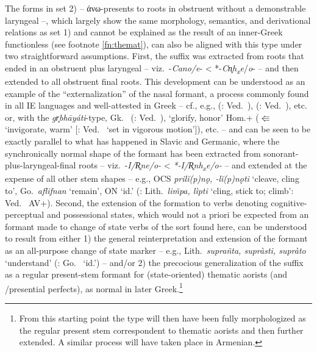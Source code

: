 \documentclass[output=paper,colorlinks,citecolor=brown]{langscibook}
\begin{document}
The forms in set 2) -- άνω-presents  to roots in obstruent without a demonstrable laryngeal --, which largely show the same morphology, semantics, and derivational relations as set 1) and cannot be explained as the result of an inner-Greek functionless  (see footnote \ref{fn:themat}), can also be aligned with this type under two straightforward assumptions. First, the suffix   was extracted from roots that ended in an obstruent plus laryngeal -- viz.\ -\textit{Cano/e}{}- < *-\textit{Cn̥h\textsubscript{x}}\textit{e}/\textit{o}{}- -- and then extended to all obstruent final roots. This development can be understood as an example of the “externalization” of the nasal formant, a process commonly found in all IE languages and well-attested in Greek -- cf., e.g.,  (: Ved.\ ),  (: Ved.\ ), etc. or, with the \textit{gr̥bhāyáti}{}-type, Gk.\   (: Ved.\ ),   ‘glorify, honor’ Hom.+ ($\Lleftarrow$   ‘invigorate, warm’ [: Ved.\  ‘set in vigorous motion’]), etc. -- and can be seen to be exactly parallel to what has happened in Slavic and Germanic, where the synchronically normal shape of the formant has been extracted from sonorant-plus-laryngeal-final roots -- viz.\ -\textit{I/R̥ne/o{}-} < \textit{*-I/R̥nh\textsubscript{x}}\textit{e/o-} -- and extended at the expense of all other stem shapes -- e.g., OCS \textit{prilĭ(p)nǫ, -lĭ(p)nǫti} ‘cleave, cling to', Go.\ \textit{aflifnan} ‘remain', ON  ‘id.’ (: Lith.\ \textit{lim̃pa, lìpti} ‘cling, stick to; climb’: Ved.\  AV+). Second, the extension of the formation to  verbs denoting cognitive-perceptual and possessional states, which would not a priori be expected from an  formant made to  change of state  verbs of the sort found here, can be understood to result from either 1) the general reinterpretation and extension of the formant as an all-purpose change of state  marker -- e.g., Lith.\ \textit{suprañta, supràsti, supràto} ‘understand’ (: Go.\  ‘id.’) -- and/or 2) the precocious generalization of the suffix as a regular present-stem formant for (state-oriented) thematic aorists (and /presential perfects), as normal in later Greek.\footnote{From this starting point the type will then have been fully morphologized as the regular present stem correspondent to thematic aorists and then further extended. A similar process will have taken place in Armenian.} 
\end{document}
